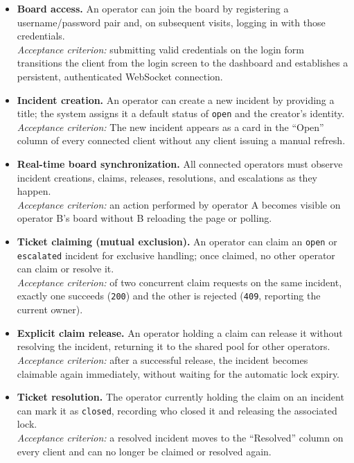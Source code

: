 \documentclass{scrartcl}
\begin{document}
\begin{itemize}
  \item[\textbf{FR1}] \textbf{Board access.} An operator can join the board by registering a username/password pair and, on subsequent visits, logging in with those credentials. \\
  \emph{Acceptance criterion:} submitting valid credentials on the login form transitions the client from the login screen to the dashboard and establishes a persistent, authenticated WebSocket connection.

  \item[\textbf{FR2}] \textbf{Incident creation.} An operator can create a new incident by providing a title; the system assigns it a default status of \texttt{open} and the creator's identity. \\
  \emph{Acceptance criterion:} The new incident appears as a card in the ``Open'' column of every connected client without any client issuing a manual refresh.

  \item[\textbf{FR3}] \textbf{Real-time board synchronization.} All connected operators must observe incident creations, claims, releases, resolutions, and escalations as they happen. \\
  \emph{Acceptance criterion:} an action performed by operator A becomes visible on operator B's board without B reloading the page or polling.

  \item[\textbf{FR4}] \textbf{Ticket claiming (mutual exclusion).} An operator can claim an \texttt{open} or \texttt{escalated} incident for exclusive handling; once claimed, no other operator can claim or resolve it. \\
  \emph{Acceptance criterion:} of two concurrent claim requests on the same incident, exactly one succeeds (\texttt{200}) and the other is rejected (\texttt{409}, reporting the current owner).

  \item[\textbf{FR5}] \textbf{Explicit claim release.} An operator holding a claim can release it without resolving the incident, returning it to the shared pool for other operators. \\
  \emph{Acceptance criterion:} after a successful release, the incident becomes claimable again immediately, without waiting for the automatic lock expiry.

  \item[\textbf{FR6}] \textbf{Ticket resolution.} The operator currently holding the claim on an incident can mark it as \texttt{closed}, recording who closed it and releasing the associated lock. \\
  \emph{Acceptance criterion:} a resolved incident moves to the ``Resolved'' column on every client and can no longer be claimed or resolved again.


\end{itemize}
\end{document}
